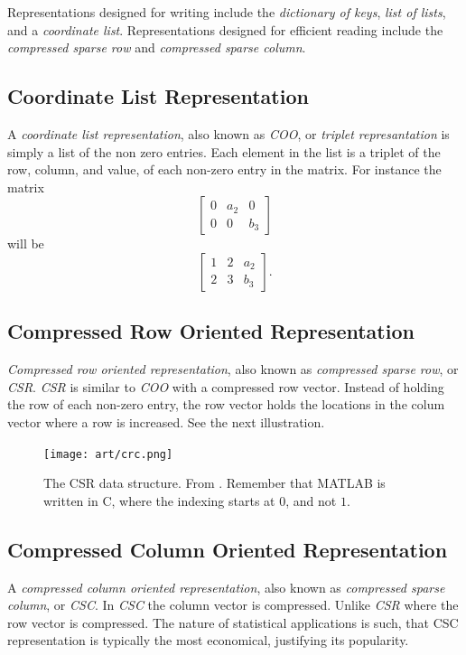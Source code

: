 \documentclass[]{book}
\theoremstyle{definition}
\theoremstyle{definition}
\theoremstyle{definition}
\theoremstyle{remark}
\begin{document}
Representations designed for writing include the \emph{dictionary of
keys}, \emph{list of lists}, and a \emph{coordinate list}.
Representations designed for efficient reading include the
\emph{compressed sparse row} and \emph{compressed sparse column}.

\subsection{Coordinate List Representation}\label{coo}

A \emph{coordinate list representation}, also known as \emph{COO}, or
\emph{triplet represantation} is simply a list of the non zero entries.
Each element in the list is a triplet of the row, column, and value, of
each non-zero entry in the matrix. For instance the matrix
\[ \begin{bmatrix}
0 & a_2 & 0 \\
0 & 0 & b_3 
\end{bmatrix}  \] will be \[ \begin{bmatrix}
1 & 2 & a_2 \\
2 & 3 & b_3 
\end{bmatrix}.  \]

\subsection{Compressed Row Oriented
Representation}\label{compressed-row-oriented-representation}

\emph{Compressed row oriented representation}, also known as
\emph{compressed sparse row}, or \emph{CSR}. \emph{CSR} is similar to
\emph{COO} with a compressed row vector. Instead of holding the row of
each non-zero entry, the row vector holds the locations in the colum
vector where a row is increased. See the next illustration.

\begin{figure}
\centering
\texttt{[image: art/crc.png]}
\caption{The CSR data structure. From \citet{shah2004sparse}. Remember
that MATLAB is written in C, where the indexing starts at \(0\), and not
\(1\).}
\end{figure}

\subsection{Compressed Column Oriented
Representation}\label{compressed-column-oriented-representation}

A \emph{compressed column oriented representation}, also known as
\emph{compressed sparse column}, or \emph{CSC}. In \emph{CSC} the column
vector is compressed. Unlike \emph{CSR} where the row vector is
compressed. The nature of statistical applications is such, that CSC
representation is typically the most economical, justifying its
popularity.
\end{document}
